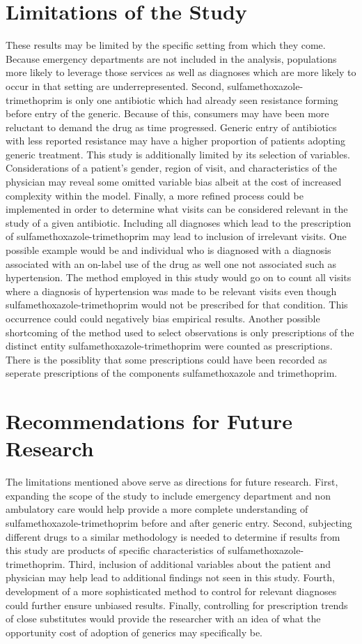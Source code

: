 \section{Limitations of the Study}
These results may be limited by the specific setting from which they come. Because emergency departments are not included in the analysis, populations more likely to leverage those services as well as diagnoses which are more likely to occur in that setting are underrepresented. Second, sulfamethoxazole-trimethoprim is only one antibiotic which had already seen resistance forming before entry of the generic. Because of this, consumers may have been more reluctant to demand the drug as time progressed. Generic entry of antibiotics with less reported resistance may have a higher proportion of patients adopting generic treatment. This study is additionally limited by its selection of variables. Considerations of a patient's gender, region of visit, and characteristics of the physician may reveal some omitted variable bias albeit at the cost of increased complexity within the model. Finally, a more refined process could be implemented in order to determine what visits can be considered relevant in the study of a given antibiotic. Including all diagnoses which lead to the prescription of sulfamethoxazole-trimethoprim may lead to inclusion of irrelevant visits. One possible example would be and individual who is diagnosed with a diagnosis associated with an on-label use of the drug as well one not associated such as hypertension. The method employed in this study would go on to count all visits where a diagnosis of hypertension was made to be relevant visits even though sulfamethoxazole-trimethoprim would not be prescribed for that condition. This occurrence could could negatively bias empirical results. Another possible shortcoming of the method used to select observations is only prescriptions of the distinct entity sulfamethoxazole-trimethoprim were counted as prescriptions. There is the possiblity that some prescriptions could have been recorded as seperate prescriptions of the components sulfamethoxazole and trimethoprim.

\section{Recommendations for Future Research}
The limitations mentioned above serve as directions for future research. First, expanding the scope of the study to include emergency department and non ambulatory care would help provide a more complete understanding of sulfamethoxazole-trimethoprim before and after generic entry. Second, subjecting different drugs to a similar methodology is needed to determine if results from this study are products of specific characteristics of sulfamethoxazole-trimethoprim. Third, inclusion of additional variables about the patient and physician may help lead to additional findings not seen in this study. Fourth, development of a more sophisticated method to control for relevant diagnoses could further ensure unbiased results. Finally, controlling for prescription trends of close substitutes would provide the researcher with an idea of what the opportunity cost of adoption of generics may specifically be. 